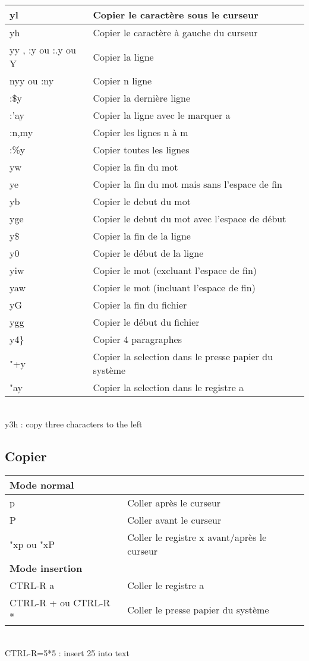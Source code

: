 \documentclass{article}
\begin{document}
\begin{tabular}{|p{3cm}| l| }\hline
yl & Copier le caractère sous le curseur \\ \hline
yh & Copier le caractère à gauche du curseur \\ \hline
yy , :y ou :.y ou Y & Copier la ligne \\ \hline
nyy ou :ny & Copier n ligne \\ \hline
:\$y & Copier la dernière ligne \\ \hline
:'ay & Copier la ligne avec le marquer a \\ \hline
:n,my & Copier les lignes n à m \\ \hline
:\%y & Copier toutes les lignes \\ \hline
yw & Copier la fin du mot \\ \hline
ye & Copier la fin du mot mais sans l'espace de fin\\ \hline
yb & Copier le debut du mot\\ \hline
yge & Copier le debut du mot avec l'espace de début\\ \hline
y\$ & Copier la fin de la ligne \\ \hline
y0 & Copier le début de la ligne \\ \hline
yiw & Copier le mot (excluant l'espace de fin)\\ \hline
yaw & Copier le mot (incluant l'espace de fin)\\ \hline
yG & Copier la fin du fichier\\ \hline
ygg & Copier le début du fichier\\ \hline
y4\} & Copier 4 paragraphes\\ \hline
"+y & Copier la selection dans le presse papier du système\\ \hline
"ay & Copier la selection dans le registre a\\ \hline
\end{tabular}\\
y3h : copy three characters to the left


\subsection{Copier}
\begin{tabular}{|p{4cm}| l| }\hline
\multicolumn{2}{|l|}{\textbf{Mode normal }} \\ \hline
p & Coller après le curseur \\ \hline
P & Coller avant le curseur \\ \hline
"xp ou "xP &  Coller le registre x avant/après le curseur \\ \hline
\multicolumn{2}{|l|}{\textbf{Mode insertion}} \\ \hline
CTRL-R a & Coller le registre a \\ \hline
CTRL-R + ou CTRL-R * & Coller le presse papier du système\\ \hline
\end{tabular}\\
CTRL-R=5*5    : insert 25 into text
\end{document}
